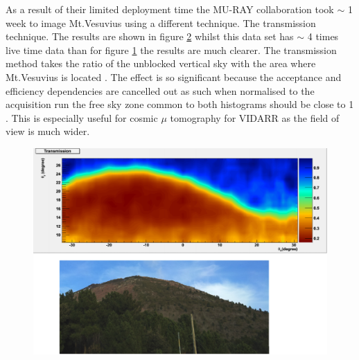 \begin{figure}[!h]
\begin{minipage}{.45\textwidth}
  \label{fig:mtVesuviusMuRayImaging}
\end{minipage}
\end{figure}

As a result of their limited deployment time the MU-RAY collaboration took $\sim$ 1 week to image Mt.Vesuvius using a different technique. The transmission technique. The results are shown in figure \ref{fig:mtVesuviusMuRayTransmission} whilst this data set has $\sim$ 4 times live time data than for figure \ref{fig:mtVesuviusMuRayImaging} the results are much clearer. The transmission method takes the ratio of the unblocked vertical sky with the area where Mt.Vesuvius is located \cite{Ambrosino_2014}. The effect is so significant because the acceptance and efficiency dependencies are cancelled out as such when normalised to the acquisition run the free sky zone common to both histograms should be close to 1 \cite{Ambrosino_2014}. This is especially useful for cosmic $\mu$ tomography for VIDARR as the field of view is much wider.


\begin{figure}[!h]
 \centering
 \includegraphics[width=0.8\linewidth]{Chapter5/Figs/Raster/mtVesuviusMuRayTransmission.png}
 \label{fig:mtVesuviusMuRayTransmission}
\end{figure}
